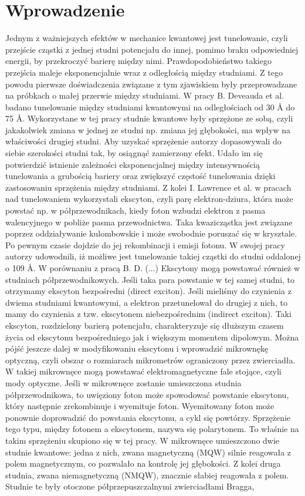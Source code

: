 \documentclass[licencjacka]{pracamgr}
\begin{document}
\chapter*{Wprowadzenie}
Jednym z ważniejszych efektów w mechanice kwantowej jest tunelowanie, czyli przejście cząstki z jednej studni potencjału do innej, pomimo braku odpowiedniej energii, by przekroczyć barierę między nimi. Prawdopodobieństwo takiego przejścia maleje eksponencjalnie wraz z odległością między studniami. Z tego powodu pierwsze doświadczenia związane z tym zjawiskiem były przeprowadzane na próbkach o małej przerwie między studniami. W pracy B. Deveauda et al. \cite{1990} badano tunelowanie między studniami kwantowymi na odległościach od 30 \r{A} do 75 \r{A}. Wykorzystane w tej pracy studnie kwantowe były sprzężone ze sobą, czyli jakakolwiek zmiana w jednej ze studni np. zmiana jej głębokości, ma wpływ na właściwości drugiej studni. Aby uzyskać sprzężenie autorzy dopasowywali do siebie szerokości studni tak, by osiągnąć zamierzony efekt. Udało im się potwierdzić istnienie zależności eksponencjalnej między intensywnością tunelowania a grubością bariery oraz zwiększyć częstość tunelowania dzięki zastosowaniu sprzężenia między studniami. Z kolei I. Lawrence et al. \cite{1994} w pracach nad tunelowaniem wykorzystali ekscyton, czyli parę elektron-dziura, która może powstać np. w półprzewodnikach, kiedy foton wzbudzi elektron z pasma walencyjnego w pobliże pasma przewodnictwa. Taka kwazicząstka jest związane poprzez oddziaływanie kulombowskie i może swobodnie poruszać się w krysztale. Po pewnym czasie dojdzie do jej rekombinacji i emisji fotonu. W swojej pracy autorzy udowodnili, iż możliwe jest tunelowanie takiej cząstki do studni oddalonej o 109 \r{A}. W porównaniu z pracą B. D. (...) Ekscytony mogą powstawać również w studniach półprzewodnikowych. Jeśli taka para powstanie w tej samej studni, to otrzymamy ekscyton bezpośredni (direct exciton). Jeśli mieliśmy do czynienia z dwiema studniami kwantowymi, a elektron przetunelował do drugiej z nich, to mamy do czynienia z tzw. ekscytonem niebezpośrednim (indirect exciton). Taki ekscyton, rozdzielony barierą potencjału, charakteryzuje się dłuższym czasem życia od ekscytonu bezpośredniego jak i większym momentem dipolowym. Można pójść jeszcze dalej w modyfikowaniu ekscytonu i wprowadzić mikrownękę optyczną, czyli obszar o rozmiarach mikrometrów ograniczony przez zwierciadła. W takiej mikrownęce mogą powstawać elektromagnetyczne fale stojące, czyli mody optyczne. Jeśli w mikrownęce zostanie umieszczona studnia półprzewodnikowa, to uwięziony foton może spowodować powstanie ekscytonu, który następnie zrekombinuje i wyemituje foton. Wyemitowany foton może ponownie doprowadzić do powstania ekscytonu, a cykl się powtórzy. Sprzężenie tego typu, między fotonem a ekscytonem, nazywa się polarytonem. To właśnie na takim sprzężeniu skupiono się w tej pracy. W mikrownęce umieszczono dwie studnie kwantowe: jedna z nich, zwana magnetyczną (MQW) silnie reagowała z polem magnetycznym, co pozwalało na kontrolę jej głębokości. Z kolei druga studnia, zwana niemagnetyczną (NMQW), znacznie słabiej reagowała z polem. Studnie te były otoczone półprzepuszczalnymi zwierciadłami Bragga, 
\end{document}
